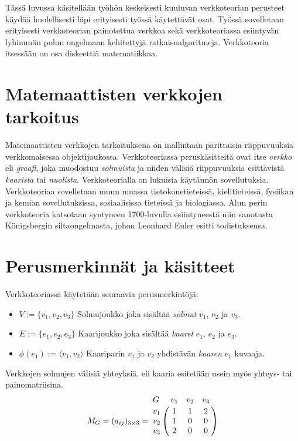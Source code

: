 Tässä luvussa käsitellään työhön keskeisesti kuuluvan verkkoteorian perusteet käydää huolellisesti läpi erityisesti työssä käytettävät osat.
Työssä sovelletaan erityisesti verkkoteorian painotettua verkkoa sekä verkkoteoriassa esiintyvän lyhimmän polun ongelmaan kehitettyjä ratkaisualgoritmeja.
Verkkoteoria itsessään on osa diskeettiä matematiikkaa.

\section{Matemaattisten verkkojen tarkoitus}

Matemaattisten verkkojen tarkoituksena on mallintaan parittaisia riippuvuuksia verkkomaisessa objektijoukossa.
Verkkoteoriassa peruskäsitteitä ovat itse \emph{verkko} eli \emph{graafi}, joka muodostuu \emph{solmuista} ja niiden välisiä riippuvuuksia esittävistä \emph{kaarista} tai \emph{nuolista}.
Verkkoteorialla on lukuisia käytännön sovellutuksia. Verkkoteoriaa sovelletaan muun muassa tietokonetieteissä, kielitieteissä, fysiikan ja kemian sovellutuksissa, sosiaalisissa tieteissä ja biologiassa.
Alun perin verkkoteoria katsotaan syntyneen 1700-luvulla esiintyneestä niin sanotusta Königsbergin siltaongelmasta, johon Leonhard Euler esitti todistuksensa.

\section{Perusmerkinnät ja käsitteet}

Verkkoteoriassa käytetään seuraavia perusmerkintöjä:
\begin{itemize}
  \item \(V := \{v_1, v_2, v_3\}\) Solmujoukko joka sisältää \emph{solmut} \(v_1\), \(v_2\) ja \(v_3\).
  \item \(E := \{e_1, e_2, e_3\}\) Kaarijoukko joka sisältää \emph{kaaret} \(e_1\), \(e_2\) ja \(e_3\).
  \item \(\phi(e_1) := \langle v_1, v_2 \rangle\) Kaariparin \(v_1\) ja \(v_2\) yhdistävän \emph{kaaren} \(e_1\) kuvaaja.
\end{itemize}

Verkkojen solmujen välisiä yhteyksiä, eli kaaria esitetään usein myös yhteys- tai painomatriisina.
\[
  M_G = (a_{ij})_{3\times3} =
  \bordermatrix{
    G & v_1 & v_2 & v_3 \cr
    v_1 & 1 & 1 & 2 \cr
    v_2 & 1 & 0 & 0 \cr
    v_3 & 2 & 0 & 0 \cr
  }
\]

